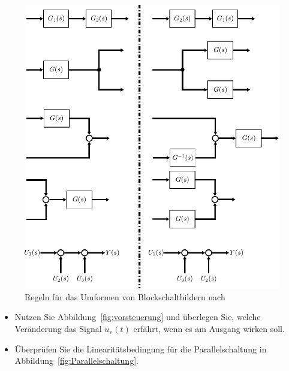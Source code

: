 \begin{figure}
	\centering
	\includegraphics[width=1\linewidth]{Abbildungen/Modellbildung/PDF/Blockschaltbildvereinfachung.pdf}
	\caption{Regeln für das Umformen von Blockschaltbildern nach \cite{Foellinger94,Lunze10}}
	\label{fig:WirkVerinfachung}
\end{figure}
%
\begin{Summary}{}{}
	\begin{itemize}
		\item Nutzen Sie Abbildung~\ref{fig:vorsteuerung} und überlegen Sie, welche Veränderung das Signal $u_{\text{v}}(t)$ erfährt, wenn es am Ausgang wirken soll.
		\item Überprüfen Sie die Linearitätsbedingung für die Parallelschaltung in Abbildung~\ref{fig:Parallelschaltung}.
	\end{itemize}
\end{Summary}